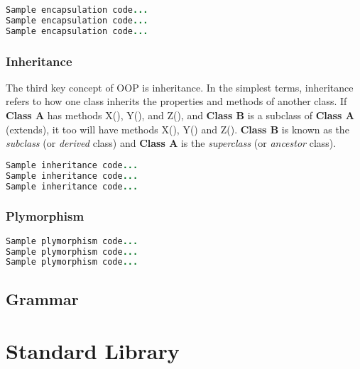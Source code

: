 \documentclass[12pt]{report}
\begin{document}
\begin{lstlisting}[language=Java,label=some-code,caption=FLOOD Encapsulation example]
Sample encapsulation code...
Sample encapsulation code...
Sample encapsulation code...
\end{lstlisting}

\subsection{Inheritance}

\begin{doublespace}
The third key concept of OOP is inheritance. In the simplest terms, inheritance refers to how one class inherits the properties and methods of another class. If \textbf{Class A} has methods X(), Y(), and Z(), and \textbf{Class B} is a subclass of \textbf{Class A} (extends), it too will have methods X(), Y() and Z(). \textbf{Class B} is known as the \textit{subclass} (or \textit{derived} class) and \textbf{Class A} is the \textit{superclass} (or \textit{ancestor} class).
\end{doublespace}

\begin{lstlisting}[language=Java,label=some-code,caption=FLOOD Inheritance example]
Sample inheritance code...
Sample inheritance code...
Sample inheritance code...
\end{lstlisting}

\subsection{Plymorphism}

\begin{doublespace}

\end{doublespace}

\begin{lstlisting}[language=Java,label=some-code,caption=FLOOD Plymorphism example]
Sample plymorphism code...
Sample plymorphism code...
Sample plymorphism code...
\end{lstlisting}

\section{Grammar}

\chapter{Standard Library}
\end{document}
